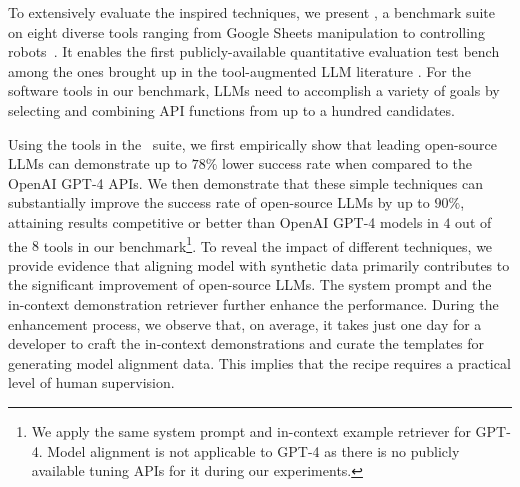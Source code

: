 To extensively evaluate the inspired techniques, we present \emph{\snact}, a benchmark suite on eight diverse tools ranging from Google Sheets manipulation to controlling robots~\cite{liang2022code}. It enables the first publicly-available quantitative evaluation test bench among the ones brought up in the tool-augmented LLM literature \cite{li2023api, qin2023tool}. For the software tools in our benchmark, LLMs need to accomplish a variety of goals by selecting and combining API functions from up to a hundred candidates. 

Using the tools in the \snact\  suite, we first empirically show that leading open-source LLMs can demonstrate up to $78\%$ lower success rate when compared to the OpenAI GPT-4 APIs.
We then demonstrate that these simple techniques can substantially improve the success rate of open-source LLMs by up to $90\%$, attaining results competitive or better than OpenAI GPT-4 models in $4$ out of the $8$ tools in our benchmark\footnote{We apply the same system prompt and in-context example retriever for GPT-4. Model alignment is not applicable to GPT-4 as there is no publicly available tuning APIs for it during our experiments.}.
To reveal the impact of different techniques, we provide evidence that aligning model with synthetic data primarily contributes to the significant improvement of open-source LLMs. The system prompt and the in-context demonstration retriever further enhance the performance.
During the enhancement process, we observe that, on average, it takes just one day for a developer to craft the in-context demonstrations and curate the templates for generating model alignment data. This implies that the recipe requires a practical level of human supervision. 

